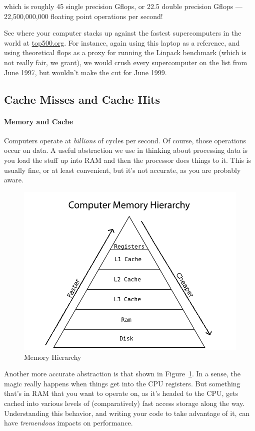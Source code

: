 which is roughly 45 single precision Gflops, or 22.5 double precision Gflops 
--- 22,500,000,000 floating point operations per second!

See where your computer stacks up against the fastest supercomputers in the 
world at \href{http://www.top500.org/}{top500.org}.  For instance, again using 
this laptop as a reference, and using theoretical flops as a proxy for running 
the Linpack benchmark (which is not really fair, we grant), we would crush 
every supercomputer on the list from June 1997, but wouldn't make the cut for 
June 1999.



\subsection{Cache Misses and Cache Hits}

\paragraph{Memory and Cache}

Computers operate at \emph{billions} of cycles per second.  Of course, those  
operations occur on data.  A useful abstraction we use in thinking about 
processing data is you load the stuff up into RAM and then the processor does 
things to it.  This is usually fine, or at least convenient, but it's not 
accurate, as you are probably aware.  

\begin{figure}[ht]
  \centering
  \includegraphics[scale=.54]{./include/pics/memory}
  \caption{Memory Hierarchy}
  \label{fig:mem}
\end{figure}
Another more accurate abstraction is that shown in Figure~\ref{fig:mem}.  In a 
sense, the magic really happens when things get into the CPU registers.  But 
something that's in RAM that you want to operate on, as it's headed to the CPU, 
gets cached into various levels of (comparatively) fast access storage along 
the way.  Understanding this behavior, and writing your code to take advantage 
of it, can have \emph{tremendous} impacts on performance.


